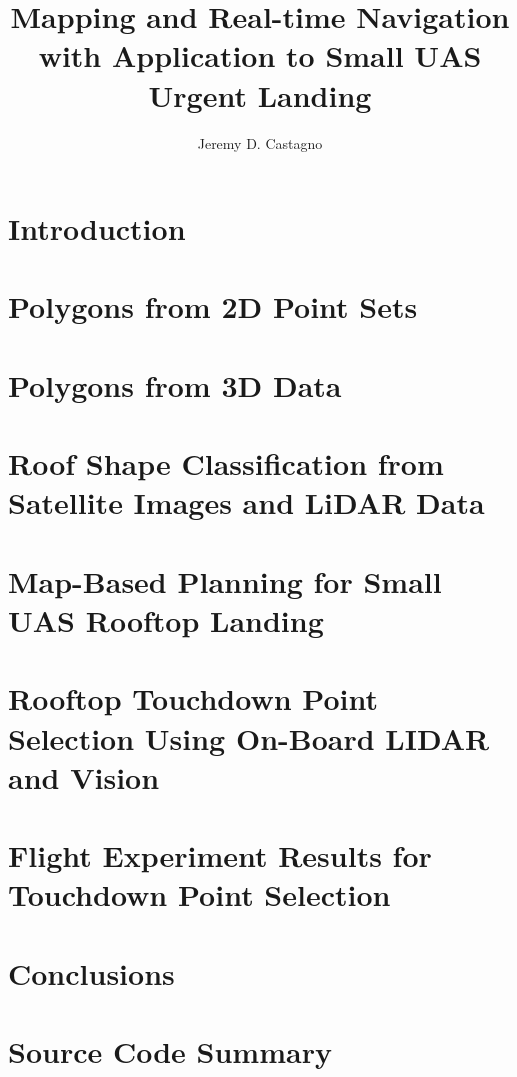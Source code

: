 \documentclass[thesis]{./style/thesis-umich}
\title{Mapping and Real-time Navigation \\ with Application to Small UAS Urgent Landing}
\author{Jeremy D. Castagno}
\theoremstyle{remark}
\begin{document}

\chapter{Introduction}
 \label{ch:introduction}
 

 
\chapter{Polygons from 2D Point Sets}
 \label{ch:polylidar}
 
 
\chapter{Polygons from 3D Data}
 \label{ch:polylidar3d}
 
 
\chapter{Roof Shape Classification from Satellite Images and LiDAR Data}
 \label{ch:roofshape}
 
 
\chapter{Map-Based Planning for Small UAS Rooftop Landing}
 \label{ch:maplanding}
 
 
\chapter{Rooftop Touchdown Point Selection Using On-Board LIDAR and Vision}
 \label{ch:landingsim}
 
 
\chapter{Flight Experiment Results for Touchdown Point Selection}
 \label{ch:experiments}
 
 
\chapter{Conclusions}
 \label{ch:conclusions}
 

\appendix

\chapter{Source Code Summary}
 \label{ch:polyliar3d_src}
 






\end{document}
